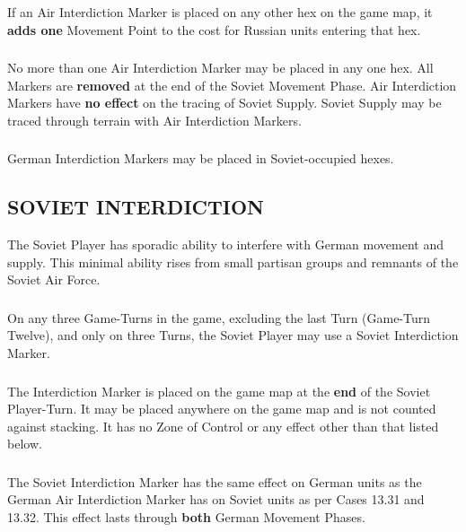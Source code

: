 \subsubsection{} If an Air Interdiction Marker is placed on any other hex on the game map, it \textbf{adds one} Movement Point to the cost for Russian units entering that hex.

\subsubsection{} No more than one Air Interdiction Marker may be placed in any one hex. All Markers are \textbf{removed} at the end of the Soviet Movement Phase. Air Interdiction Markers have \textbf{no effect} on the tracing of Soviet Supply. Soviet Supply may be traced through terrain with Air Interdiction Markers.

\subsubsection{} German Interdiction Markers may be placed in Soviet-occupied hexes.

\subsection{SOVIET INTERDICTION}

The Soviet Player has sporadic ability to interfere with German movement and supply. This minimal ability rises from small partisan groups and remnants of the Soviet Air Force.

\subsubsection{} On any three Game-Turns in the game, excluding the last Turn (Game-Turn Twelve), and only on three Turns, the Soviet Player may use a Soviet Interdiction Marker.

\subsubsection{} The Interdiction Marker is placed on the game map at the \textbf{end} of the Soviet Player-Turn. It may be placed anywhere on the game map and is not counted against stacking. It has no Zone of Control or any effect other than that listed below.

\subsubsection{} The Soviet Interdiction Marker has the same effect on German units as the German Air Interdiction Marker has on Soviet units as per Cases 13.31 and 13.32. This effect lasts through \textbf{both} German Movement Phases.

